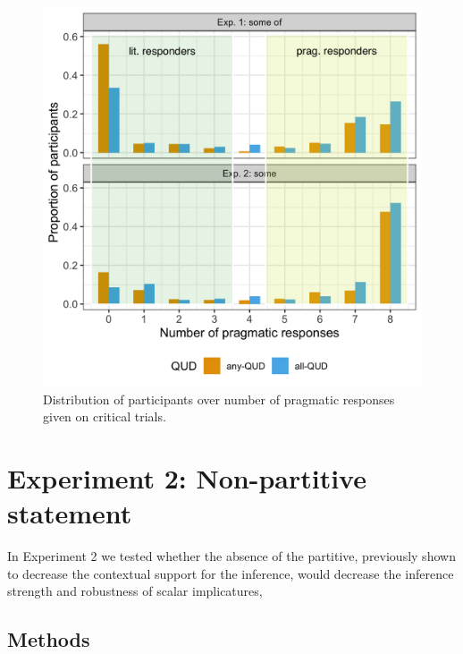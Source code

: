 \documentclass[10pt,letterpaper]{article}
\begin{document}
\begin{figure}
  \includegraphics[width=\linewidth]{plots/proportion.png}
  \caption{Distribution of participants over number of pragmatic responses given on critical trials. \label{fig:proportion}}
\end{figure}

\section{Experiment 2: Non-partitive statement}

In Experiment 2 we tested whether the absence of the partitive, previously shown to decrease the contextual support for the inference, would decrease the inference strength and robustness of scalar implicatures,


\subsection{Methods}
\end{document}
